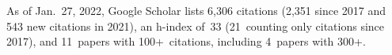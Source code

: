 %
As of Jan.~27, 2022, Google Scholar lists
6,306 citations (2,351 since 2017 and 543 new citations in 2021),
an h-index of~33 (21~counting only citations since 2017),
and 11~papers with 100+~citations, including 4~papers with 300+.
